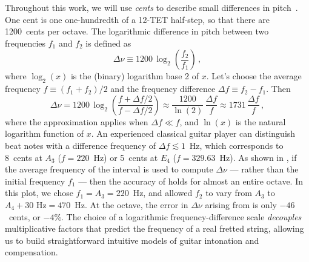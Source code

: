 Throughout this work, we will use \emph{cents} to describe small differences in pitch~\cite{ref:durfee2015pms,ref:varieschi2010icf,ref:hall1985see,ref:hall1988anl,ref:krantz2000cie,ref:jedrzejewski2008gds}. One cent is one one-hundredth of a 12-TET half-step, so that there are 1200~cents per octave.  The logarithmic difference in pitch between two frequencies $f_1$ and $f_2$ is defined as
 \begin{equation} \label{eqn:cents_def}
\Delta \nu \equiv 1200\, \log_2\left(\frac{f_2}{f_1}\right)\, ,
 \end{equation}
 where $\log_2(x)$ is the (binary) logarithm base 2 of $x$. Let's choose the average frequency $f \equiv (f_1 + f_2) / 2$ and the frequency difference $\Delta f \equiv f_2 - f_1$. Then
 \begin{equation} \label{eqn:cents_approx}
\Delta \nu = 1200\, \log_2\left(\frac{f + \Delta f / 2}{f - \Delta f /2}\right) \approx \frac{1200}{\ln(2)}\, \frac{\Delta f}{f} \approx 1731\, \frac{\Delta f}{f}\, ,
 \end{equation}
where the approximation applies when $\Delta f \ll f$, and $\ln(x)$ is the natural logarithm function of $x$. An experienced classical guitar player can distinguish beat notes with a difference frequency of $\Delta f \lesssim 1$~Hz, which corresponds to 8~cents at $A_3$ ($f = 220$~Hz) or 5~cents at $E_4$ ($f = 329.63$~Hz). As shown in , if the average frequency of the interval is used to compute $\Delta \nu$ --- rather than the initial frequency $f_1$ --- then the accuracy of  holds for almost an entire octave. In this plot, we chose $f_1 = A_3 = 220$~Hz, and allowed $f_2$ to vary from $A_3$ to $A_4 + 30 \textrm{ Hz} = 470$~Hz. At the octave, the error in $\Delta \nu$ arising from  is only $-46$~cents, or $-4$\%. The choice of a logarithmic frequency-difference scale \emph{decouples} multiplicative factors that predict the frequency of a real fretted string, allowing us to build straightforward intuitive models of guitar intonation and compensation.

